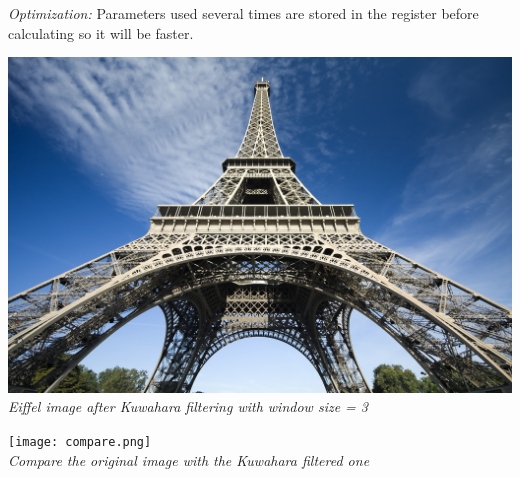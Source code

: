 \documentclass{article}
\begin{document}
\textit{Optimization:} Parameters used several times are stored in the register before calculating so it will be faster. \\

\begin{center}
    \includegraphics[width=\linewidth]{kuwahara.jpg}
    \\
    \textit{Eiffel image after Kuwahara filtering with window size = 3}
\end{center}

\begin{center}
    \texttt{[image: compare.png]}
    \\
    \textit{Compare the original image with the Kuwahara filtered one}
\end{center}
\end{document}
